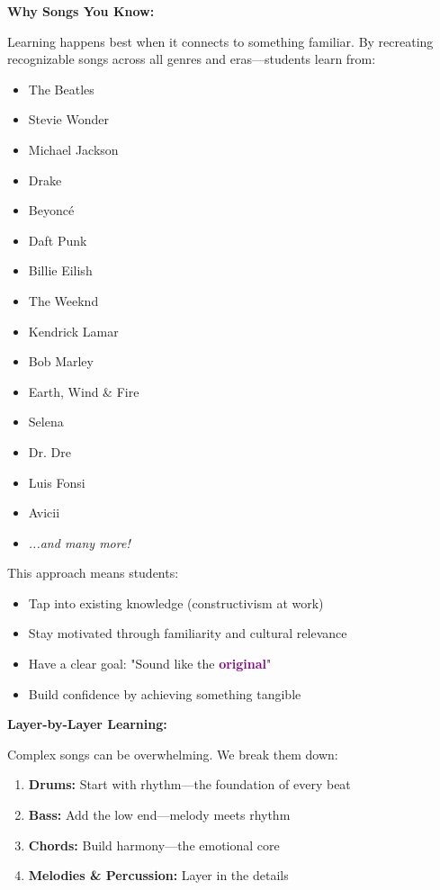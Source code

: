 \documentclass[11pt,letterpaper]{article}
\newcommand{\purple}[1]{\textcolor{purple}{\textbf{#1}}}
\begin{document}
\textbf{Why Songs You Know:}

Learning happens best when it connects to something familiar. By recreating recognizable songs across all genres and eras—students learn from:

\begin{multicols}{2}
\begin{itemize}[leftmargin=*, itemsep=0pt]
\item The Beatles
\item Stevie Wonder
\item Michael Jackson
\item Drake
\item Beyoncé
\item Daft Punk
\item Billie Eilish
\item The Weeknd
\item Kendrick Lamar
\item Bob Marley
\item Earth, Wind \& Fire
\item Selena
\item Dr. Dre
\item Luis Fonsi
\item Avicii
\item \textit{...and many more!}
\end{itemize}
\end{multicols}

\vspace{0.3cm}

This approach means students:
\begin{itemize}[leftmargin=*]
\item Tap into existing knowledge (constructivism at work)
\item Stay motivated through familiarity and cultural relevance
\item Have a clear goal: "Sound like the \purple{original}"
\item Build confidence by achieving something tangible
\end{itemize}

\textbf{Layer-by-Layer Learning:}

Complex songs can be overwhelming. We break them down:
\begin{enumerate}[leftmargin=*]
\item \textbf{Drums:} Start with rhythm—the foundation of every beat
\item \textbf{Bass:} Add the low end—melody meets rhythm
\item \textbf{Chords:} Build harmony—the emotional core
\item \textbf{Melodies \& Percussion:} Layer in the details
\end{enumerate}
\end{document}
